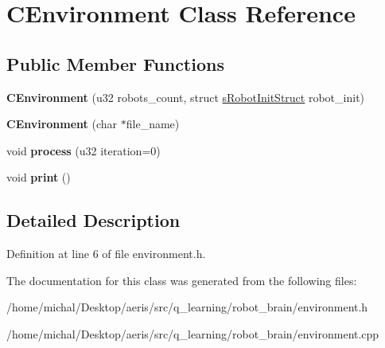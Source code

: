 \hypertarget{classCEnvironment}{\section{C\-Environment Class Reference}
\label{classCEnvironment}
}
\subsection*{Public Member Functions}
\begin{DoxyCompactItemize}
\item 
\hypertarget{classCEnvironment_a72bd1a093766dfe37b8e8a66d7e9fa8c}{{\bfseries C\-Environment} (u32 robots\-\_\-count, struct \hyperlink{structsRobotInitStruct}{s\-Robot\-Init\-Struct} robot\-\_\-init)}\label{classCEnvironment_a72bd1a093766dfe37b8e8a66d7e9fa8c}

\item 
\hypertarget{classCEnvironment_a585ddb602f822597e4f39582041c368a}{{\bfseries C\-Environment} (char $\ast$file\-\_\-name)}\label{classCEnvironment_a585ddb602f822597e4f39582041c368a}

\item 
\hypertarget{classCEnvironment_ab7df8542980865c6880aa9a12322b3f9}{void {\bfseries process} (u32 iteration=0)}\label{classCEnvironment_ab7df8542980865c6880aa9a12322b3f9}

\item 
\hypertarget{classCEnvironment_a1e2b4bc541bca9755a15dc94bfd5a971}{void {\bfseries print} ()}\label{classCEnvironment_a1e2b4bc541bca9755a15dc94bfd5a971}

\end{DoxyCompactItemize}


\subsection{Detailed Description}


Definition at line 6 of file environment.\-h.



The documentation for this class was generated from the following files\-:\begin{DoxyCompactItemize}
\item 
/home/michal/\-Desktop/aeris/src/q\-\_\-learning/robot\-\_\-brain/environment.\-h\item 
/home/michal/\-Desktop/aeris/src/q\-\_\-learning/robot\-\_\-brain/environment.\-cpp\end{DoxyCompactItemize}
